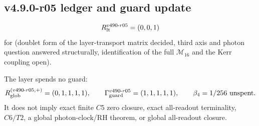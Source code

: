 \subsection*{v4.9.0-r05 ledger and guard update}
\label{subsec:v490-r05-ledger-guard}

\[
R_{\rm lt}^{v490\text{-}r05}=(0,0,1)
\]
for (doublet form of the layer-transport matrix decided, third axis and photon question answered structurally,
identification of the full \(\mathcal M_{16}\) and the Kerr coupling open).

The layer spends no guard:
\[
R_{\rm glob}^{(v490\text{-}r05,+)}=(0,1,1,1,1),
\qquad
\Gamma_{\rm guard}^{v490\text{-}r05}=(1,1,1,1,1),
\qquad
\beta_4=1/256\ \text{unspent}.
\]
It does not imply exact finite \(C5\) zero closure, exact all-readout terminality,
\(C6/T2\), a global photon-clock/RH theorem, or global all-readout closure.

